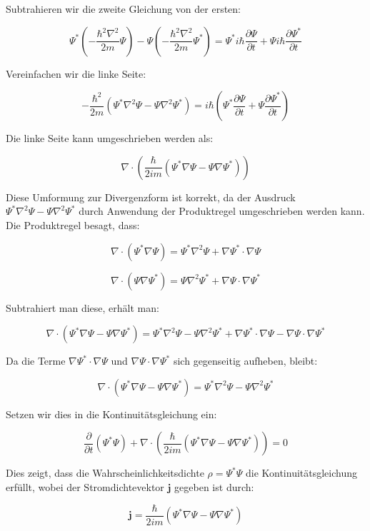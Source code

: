 \documentclass[11pt,a4paper]{article}
\begin{document}
Subtrahieren wir die zweite Gleichung von der ersten:

\[
\Psi^* \left(-\frac{\hbar^2 \nabla^2}{2 m} \Psi\right) - \Psi \left(-\frac{\hbar^2 \nabla^2}{2 m} \Psi^*\right) = \Psi^* i \hbar \frac{\partial \Psi}{\partial t} + \Psi i \hbar \frac{\partial \Psi^*}{\partial t}
\]

Vereinfachen wir die linke Seite:

\[
-\frac{\hbar^2}{2 m} \left(\Psi^* \nabla^2 \Psi - \Psi \nabla^2 \Psi^*\right) = i \hbar \left(\Psi^* \frac{\partial \Psi}{\partial t} + \Psi \frac{\partial \Psi^*}{\partial t}\right)
\]

Die linke Seite kann umgeschrieben werden als:

\[
\nabla \cdot \left(\frac{\hbar}{2 i m} \left(\Psi^* \nabla \Psi - \Psi \nabla \Psi^*\right)\right)
\]

Diese Umformung zur Divergenzform ist korrekt, da der Ausdruck \(\Psi^* \nabla^2 \Psi - \Psi \nabla^2 \Psi^*\) durch Anwendung der Produktregel umgeschrieben werden kann. Die Produktregel besagt, dass:

\[
\nabla \cdot (\Psi^* \nabla \Psi) = \Psi^* \nabla^2 \Psi + \nabla \Psi^* \cdot \nabla \Psi
\]

\[
\nabla \cdot (\Psi \nabla \Psi^*) = \Psi \nabla^2 \Psi^* + \nabla \Psi \cdot \nabla \Psi^*
\]

Subtrahiert man diese, erhält man:

\[
\nabla \cdot (\Psi^* \nabla \Psi - \Psi \nabla \Psi^*) = \Psi^* \nabla^2 \Psi - \Psi \nabla^2 \Psi^* + \nabla \Psi^* \cdot \nabla \Psi - \nabla \Psi \cdot \nabla \Psi^*
\]

Da die Terme \(\nabla \Psi^* \cdot \nabla \Psi\) und \(\nabla \Psi \cdot \nabla \Psi^*\) sich gegenseitig aufheben, bleibt:

\[
\nabla \cdot (\Psi^* \nabla \Psi - \Psi \nabla \Psi^*) = \Psi^* \nabla^2 \Psi - \Psi \nabla^2 \Psi^*
\]

Setzen wir dies in die Kontinuitätsgleichung ein:

\[
\frac{\partial}{\partial t} (\Psi^* \Psi) + \nabla \cdot \left(\frac{\hbar}{2 i m} \left(\Psi^* \nabla \Psi - \Psi \nabla \Psi^*\right)\right) = 0
\]

Dies zeigt, dass die Wahrscheinlichkeitsdichte \(\rho = \Psi^* \Psi\) die Kontinuitätsgleichung erfüllt, wobei der Stromdichtevektor \(\mathbf{j}\) gegeben ist durch:

\[
\mathbf{j} = \frac{\hbar}{2 i m} \left(\Psi^* \nabla \Psi - \Psi \nabla \Psi^*\right)
\]
\end{document}
